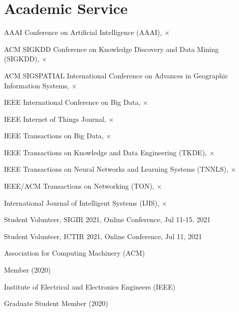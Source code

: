 \section*{Academic Service}


\indent

AAAI Conference on Artificial Intelligence (AAAI), $\times$

ACM SIGKDD Conference on Knowledge Discovery and Data Mining (SIGKDD), $\times$

ACM SIGSPATIAL International Conference on Advances in Geographic Information Systems, $\times$

IEEE International Conference on Big Data, $\times$

IEEE Internet of Things Journal, $\times$

IEEE Transactions on Big Data, $\times$

IEEE Transactions on Knowledge and Data Engineering (TKDE), $\times$

IEEE Transactions on Neural Networks and Learning Systems (TNNLS), $\times$

IEEE/ACM Transactions on Networking (TON), $\times$

International Journal of Intelligent Systems (IJIS), $\times$

\indent 

Student Volunteer, SIGIR 2021, Online Conference, Jul 11-15, 2021

Student Volunteer, ICTIR 2021, Online Conference, Jul 11, 2021

\indent 

Association for Computing Machinery (ACM)  

\hspace{2em}Member (2020)

Institute of Electrical and Electronics Engineers (IEEE)

\hspace{2em}Graduate Student Member (2020)